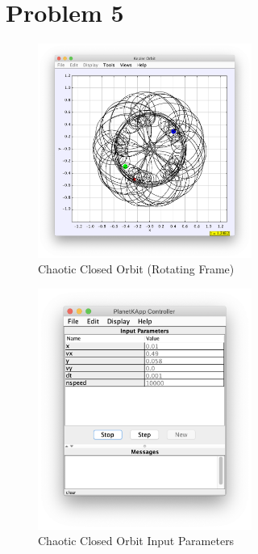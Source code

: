 \documentclass[pra,superscriptaddress,reprint,showpacs]{revtex4-1}
\begin{document}
\section{Problem 5}
\begin{figure}[h!]
    \centering 
    \caption{Chaotic Closed Orbit (Rotating Frame)}
    \includegraphics[width=7cm]{5chaoticorbit.png}
\end{figure}

\begin{figure}[h!]
    \centering 
    \caption{Chaotic Closed Orbit Input Parameters}
    \includegraphics[width=7cm]{5ip.png}
\end{figure}
\end{document}
